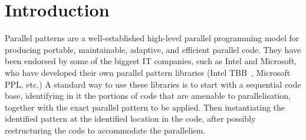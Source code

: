 %

\section{Introduction}

Parallel patterns are a well-established high-level parallel programming model for producing portable, maintainable, adaptive, and efficient parallel code. They have been endorsed by some of the biggest IT companies, such as Intel and Microsoft, who have developed their own parallel pattern libraries (Intel TBB~\cite{DBLP:reference/parallel/X11pz}, Microsoft PPL, etc.) A standard way to use these libraries is to start with a sequential code base, identifying in it the portions of code that are amenable to parallelisation, together with the exact parallel pattern to be applied.  Then instantiating the identified pattern at the identified location in the code, after possibly restructuring the code to accommodate the parallelism. 


